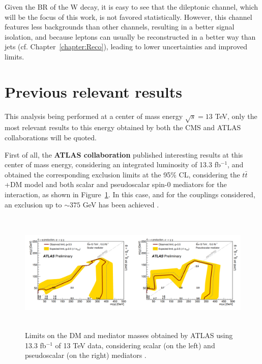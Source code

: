 \documentclass[a4paper, 10pt, openright]{report}
\begin{document}
Given the \ac{BR} of the W decay, it is easy to see that the dileptonic channel, which will be the focus of this work, is not favored statistically. However, this channel features less backgrounds than other channels, resulting in a better signal isolation, and because leptons can usually be reconstructed in a better way than jets (cf. Chapter~\ref{chapter:Reco}), leading to lower uncertainties and improved limits.

\section{Previous relevant results} \label{section:PreviousResults}

This analysis being performed at a center of mass energy $\sqrt{s} = 13$ TeV, only the most relevant results to this energy obtained by both the \ac{CMS} and \ac{ATLAS} collaborations will be quoted. 

First of all, the \textbf{\ac{ATLAS} collaboration} published interesting results at this center of mass energy, considering an integrated luminosity of 13.3 fb$^{-1}$, and obtained the corresponding exclusion limits at the 95\% \ac{CL}, considering the $t \bar t$+DM model and both scalar and pseudoscalar spin-0 mediators for the interaction, as shown in Figure~\ref{fig:ATLAS13}. In this case, and for the couplings considered, an exclusion up to $\sim375$ GeV has been achieved \cite{PreviousDoubleTopNoLep13ATLAS}.

\begin{figure}[htbp]
\begin{center}
\includegraphics[width=14cm, height=5.8cm]{figs/Atlasttbar13fb.png}
\caption{Limits on the \ac{DM} and mediator masses obtained by \ac{ATLAS} using 13.3 fb$^{-1}$ of 13 TeV data, considering scalar (on the left) and pseudoscalar (on the right) mediators \cite{PreviousDoubleTopNoLep13ATLAS}.}
\label{fig:ATLAS13}
\end{center}
\end{figure}
\end{document}
